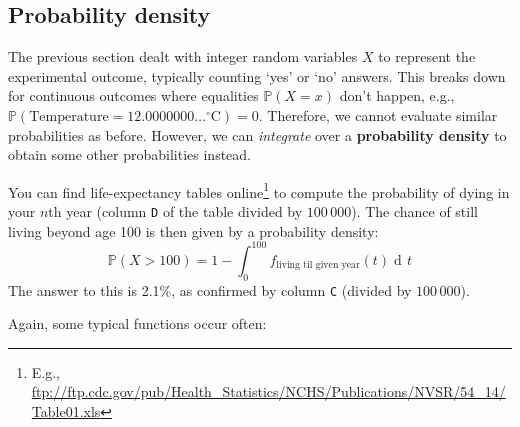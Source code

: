 \documentclass{article}
\DeclareMathOperator{\di}{d\!}
\begin{document}
\subsection{Probability density}
The previous section dealt with integer random variables $X$ to represent the experimental outcome, typically counting `yes' or `no' answers. This breaks down for continuous outcomes where equalities $\mathbb{P}(X=x)$ don't happen, e.g., $\mathbb{P}(\text{Temperature}=12.0000000\dots^\circ\!\text{C})=0$. Therefore, we cannot evaluate similar probabilities as before. However, we can \textit{integrate} over a \textbf{probability density} to obtain some other probabilities instead.
\begin{testexample}
    You can find life-expectancy tables online\footnote{E.g., \url{ftp://ftp.cdc.gov/pub/Health_Statistics/NCHS/Publications/NVSR/54_14/Table01.xls}} to compute the probability of dying in your $n$th year (column \texttt{D} of the table divided by $100\,000$). The chance of still living beyond age 100 is then given by a probability density:
    \begin{equation}
        \mathbb{P}(X> 100)=1 - \int_{0}^{100} f_\text{living til given year}(t)\di t
    \end{equation}
    The answer to this is 2.1\%, as confirmed by column \texttt{C} (divided by $100\,000$).
\end{testexample}\vspace{-0.3cm}
{\flushleft Again}, some typical functions occur often:
\end{document}
